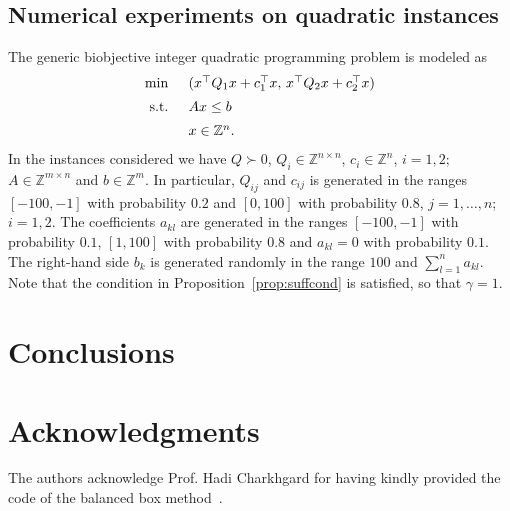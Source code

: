 \documentclass[preprint,12pt]{elsarticle}
\def\Q{\mathbb{Q}}
\def\Z{\mathbb{Z}}
\begin{document}
\subsection{Numerical experiments on quadratic instances}\label{sec:expquad}
The generic biobjective integer quadratic programming problem is modeled as
\begin{equation*}\label{BOIQP}
\begin{array}{l l}
    \min & (x^\top Q_1 x + c_1^\top x,\, x^\top Q_2 x + c_2^\top x)\\[1.2ex]
    \textnormal{ s.t. }&  A x \leq b\\[1.2ex]
    & x\in\Z^n.
  \end{array}
 \end{equation*}
In the instances considered we have $Q\succ 0$,  $Q_i\in \Z^{n\times n}$, $c_i\in \Z^n$, $i=1,2$;\; $A\in \Z^{m\times n}$ and $b\in \Z^m$.
In particular, $Q_{ij}$ and $c_{ij}$ is generated in the ranges $[-100,-1]$ with probability $0.2$ and $[0,100]$ with probability $0.8$,
$j=1,\ldots,n$; $i=1,2$. The coefficients $a_{kl}$ are generated in the ranges $[-100,-1]$ with probability $0.1$,
$[1,100]$ with probability $0.8$ and $a_{kl}=0$ with probability $0.1$.
The right-hand side $b_k$ is generated randomly in the range $100$ and $\sum_{l=1}^n a_{kl}$.
Note that the condition in Proposition~\ref{prop:suffcond} is satisfied, so that $\gamma=1$.



\section{Conclusions}\label{sec:conc}

\section{Acknowledgments}
The authors acknowledge Prof. Hadi Charkhgard for having kindly provided the code of the balanced box method~\cite{boland2015criterion}.

%


	
\end{document}
